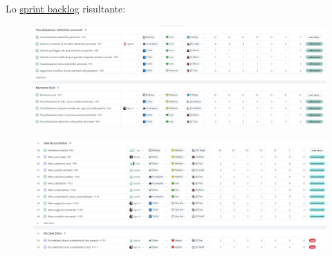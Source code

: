 
Lo \href{https://github.com/orgs/ISIQuiz/projects/3/views/19}{sprint backlog} risultante:

\begin{figure}[H]
    \centering
    \includegraphics[width=\textwidth]{process/Img/Sprint8BL1.png}
    \label{fig:Sprint8BL}
\end{figure}

\begin{figure}[H]
    \centering
    \includegraphics[width=\textwidth]{process/Img/Sprint8BL2.png}
    \label{fig:Sprint8BL}
\end{figure}